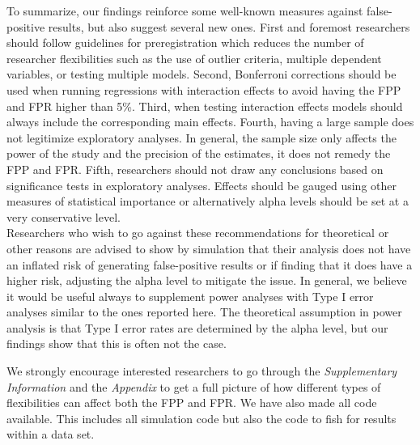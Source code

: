 To summarize, our findings reinforce some well-known measures against false-positive results, but also suggest several new ones. First and foremost researchers should follow guidelines for preregistration \citep{Nosek2015,VANTVEER20162} which reduces the number of researcher flexibilities such as the use of outlier criteria, multiple dependent variables, or testing multiple models. Second, Bonferroni corrections should be used when running regressions with interaction effects to avoid having the FPP and FPR higher than 5\%. Third, when testing interaction effects models should always include the corresponding main effects. Fourth, having a large sample does not legitimize exploratory analyses. In general, the sample size only affects the power of the study and the precision of the estimates, it does not remedy the FPP and FPR. Fifth, researchers should not draw any conclusions based on significance tests in exploratory analyses. Effects should be gauged using other measures of statistical importance or alternatively alpha levels should be set at a very conservative level. \\

Researchers who wish to go against these recommendations for theoretical or other reasons are advised to show by simulation that their analysis does not have an inflated risk of generating false-positive results or if finding that it does have a higher risk, adjusting the alpha level to mitigate the issue. In general, we believe it would be useful always to supplement power analyses with Type I error analyses similar to the ones reported here. The theoretical assumption in power analysis is that Type I error rates are determined by the alpha level, but our findings show that this is often not the case.


We strongly encourage interested researchers to go through the \textit{Supplementary Information} and the \textit{Appendix} to get a full picture of how different types of flexibilities can affect both the FPP and FPR. We have also made all code available. This includes all simulation code but also the code to fish for results within a data set.  
 
 

